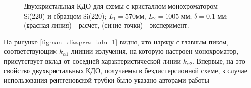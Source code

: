 \begin{figure}[H]
  \centering
  \hfill
  \hfill
  \hfill
  \caption{Двухкристальная КДО для схемы с кристаллом монохроматором Si(220) и образцом  Si(220); $L_1= 570 $мм,
  $L_2 = 1005$ мм; $\delta = 0.1$ мм; (красная линия) - расчет, (синие точки) - эксперимент.}
  \label{ris:non_disspers_kdo}
\end{figure}

На рисунке \ref{fig:non_disspers_kdo_1} видно, что наряду с главным пиком, соответствующим $k_{\alpha1}$ лиинии
излучения, на которую настроен монохроматор, присутствует вклад от соседней характеристической линии
 $k_{\alpha2}$. Впервые, на это свойство двухкристальных КДО, получаемы в бездисперсионной
схеме, в случае использования рентгеновской трубки было указано авторами работы \cite{chuev2008}
